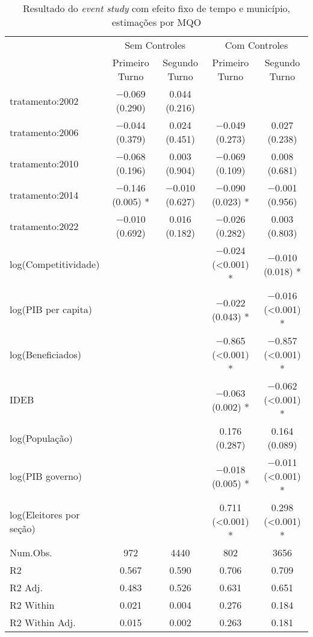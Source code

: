 \begin{table}
\centering
\caption{Resultado do \textit{event study} com efeito fixo de tempo e município, estimações por MQO}
\begin{tabular}[t]{lcccc}
\toprule
& \multicolumn{2}{c}{Sem Controles} & \multicolumn{2}{c}{Com Controles} \\
  \cmidrule(lr){2-3} \cmidrule(lr){4-5}
  & Primeiro Turno & Segundo Turno & Primeiro Turno & Segundo Turno\\
\midrule
tratamento:2002 & \num{-0.069} (\num{0.290}) & \num{0.044} (\num{0.216}) &  & \\
tratamento:2006 & \num{-0.044} (\num{0.379}) & \num{0.024} (\num{0.451}) & \num{-0.049} (\num{0.273}) & \num{0.027} (\num{0.238})\\
tratamento:2010 & \num{-0.068} (\num{0.196}) & \num{0.003} (\num{0.904}) & \num{-0.069} (\num{0.109}) & \num{0.008} (\num{0.681})\\
tratamento:2014 & \num{-0.146} (\num{0.005}) * & \num{-0.010} (\num{0.627}) & \num{-0.090} (\num{0.023}) * & \num{-0.001} (\num{0.956})\\
tratamento:2022 & \num{-0.010} (\num{0.692}) & \num{0.016} (\num{0.182}) & \num{-0.026} (\num{0.282}) & \num{0.003} (\num{0.803})\\
log(Competitividade) &  &  & \num{-0.024} (\num{<0.001}) * & \num{-0.010} (\num{0.018}) *\\
log(PIB per capita) &  &  & \num{-0.022} (\num{0.043}) * & \num{-0.016} (\num{<0.001}) *\\
log(Beneficiados) &  &  & \num{-0.865} (\num{<0.001}) * & \num{-0.857} (\num{<0.001}) *\\
IDEB &  &  & \num{-0.063} (\num{0.002}) * & \num{-0.062} (\num{<0.001}) *\\
log(População) &  &  & \num{0.176} (\num{0.287}) & \num{0.164} (\num{0.089})\\
log(PIB governo) &  &  & \num{-0.018} (\num{0.005}) * & \num{-0.011} (\num{<0.001}) *\\
log(Eleitores por seção) &  &  & \num{0.711} (\num{<0.001}) * & \num{0.298} (\num{<0.001}) *\\
\midrule
Num.Obs. & \num{972} & \num{4440} & \num{802} & \num{3656}\\
R2 & \num{0.567} & \num{0.590} & \num{0.706} & \num{0.709}\\
R2 Adj. & \num{0.483} & \num{0.526} & \num{0.631} & \num{0.651}\\
R2 Within & \num{0.021} & \num{0.004} & \num{0.276} & \num{0.184}\\
R2 Within Adj. & \num{0.015} & \num{0.002} & \num{0.263} & \num{0.181}\\
\bottomrule
\end{tabular}

\label{tab_eventStud}
\end{table}